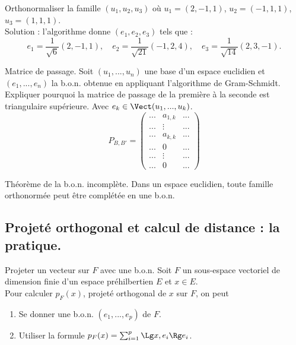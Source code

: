 \documentclass[11pt]{article}
\begin{document}
\begin{ex}{}{}
    Orthonormaliser la famille $(u_1,u_2,u_3)$ où $u_1=(2,-1,1)$, $u_2=(-1,1,1)$, $u_3=(1,1,1)$.\\
    Solution : l'algorithme donne $(e_1,e_2,e_3)$ tels que :
    \begin{equation*}
        e_1=\frac{1}{\sqrt{6}}(2,-1,1), \quad e_2=\frac{1}{\sqrt{21}}(-1,2,4), \quad e_3=\frac{1}{\sqrt{14}}(2,3,-1).
    \end{equation*}
\end{ex}

\begin{ex}{Matrice de passage.}{}
    Soit $(u_1,...,u_n)$ une base d'un espace euclidien et $(e_1,...,e_n)$ la b.o.n. obtenue en appliquant l'algorithme de Gram-Schmidt. Expliquer pourquoi la matrice de passage de la première à la seconde est triangulaire supérieure.
    \tcblower
    Avec $e_k\in\Vect(u_1,...,u_k)$.
    \begin{equation*}
        P_{B,B'}=\begin{pmatrix}
            ... &a_{1,k} &...\\
            ... &\vdots &...\\
            ... &a_{k,k} &...\\
            ... &0 &...\\
            ... &\vdots &...\\
            ... &0 &... 
        \end{pmatrix}
    \end{equation*}
\end{ex}

\begin{prop}{Théorème de la b.o.n. incomplète.}{}
    Dans un espace euclidien, toute famille orthonormée peut être complétée en une b.o.n.
\end{prop}
\pagebreak
\subsection{Projeté orthogonal et calcul de distance : la pratique.}

\begin{meth}{Projeter un vecteur sur $F$ avec une b.o.n.}{}
    Soit $F$ un sous-espace vectoriel de dimension finie d'un espace préhilbertien $E$ et $x\in E$.\\
    Pour calculer $p_F(x)$, projeté orthogonal de $x$ sur $F$, on peut
    \begin{enumerate}[topsep=0pt,itemsep=-0.9ex]
        \item Se donner une b.o.n. $(e_1,...,e_p)$ de $F$.
        \item Utiliser la formule $p_F(x)=\sum_{i=1}^p\Lg x, e_i\Rg e_i$.
    \end{enumerate}
\end{meth}
\end{document}
